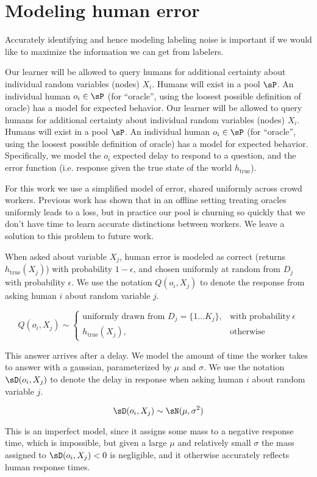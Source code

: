 \section{Modeling human error}
\label{sec:human-error}

Accurately identifying and hence modeling labeling noise is important if we would like to maximize the information we can get from labelers.



Our learner will be allowed to query humans for additional certainty about individual random variables (nodes) $X_i$.
 Humans will exist in a pool $\sP$.
 An individual human $o_i \in \sP$ (for ``oracle'', using the loosest possible definition of oracle) has a model for expected behavior.
Our learner will be allowed to query humans for additional certainty about individual random variables (nodes) $X_i$.
 Humans will exist in a pool $\sP$.
 An individual human $o_i \in \sP$ (for ``oracle'', using the loosest possible definition of oracle) has a model for expected behavior. Specifically, we model the $o_i$ expected delay to respond to a question, and the error function (i.e. response given the true state of the world $h_{\text{true}}$).

For this work we use a simplified model of error, shared uniformly across crowd workers.
 Previous work \cite{yan2011active} \cite{donmez2008proactive} \cite{golovin2010near} has shown that in an offline setting treating oracles uniformly leads to a loss, but in practice our pool is churning so quickly that we don't have time to learn accurate distinctions between workers.
 We leave a solution to this problem to future work.

When asked about variable $X_j$, human error is modeled as correct (returns $h_{\text{true}}(X_j)$) with probability $1-\epsilon$, and chosen uniformly at random from $D_j$ with probability $\epsilon$.
 We use the notation $Q(o_i, X_j)$ to denote the response from asking human $i$ about random variable $j$.

\begin{equation}
    Q(o_i, X_j) \sim
    \begin{cases}
       \text{uniformly drawn from } D_j = \{1 \ldots K_j\}, & \text{with probability}\ \epsilon \\
      h_{\text{true}}(X_j), & \text{otherwise}
    \end{cases}
 \end{equation}
 
This answer arrives after a delay.
 We model the amount of time the worker takes to answer with a gaussian, parameterized by $\mu$ and $\sigma$.
 We use the notation $\sD(o_i, X_j)$ to denote the delay in response when asking human $i$ about random variable $j$.

\[\sD(o_i, X_j) \sim \sN(\mu, \sigma^2)\]

This is an imperfect model, since it assigns some mass to a negative response time, which is impossible, but given a large $\mu$ and relatively small $\sigma$ the mass assigned to $\sD(o_i, X_j) < 0$ is negligible, and it otherwise accurately reflects human response times.

